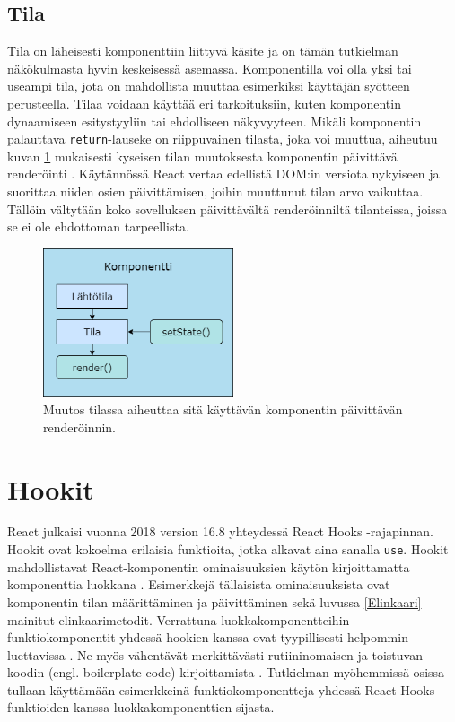 
\subsection{Tila}
\label{Tila}

Tila on läheisesti komponenttiin liittyvä käsite ja on tämän tutkielman näkökulmasta hyvin keskeisessä asemassa. Komponentilla voi olla yksi tai useampi tila, jota on mahdollista muuttaa esimerkiksi käyttäjän syötteen perusteella. Tilaa voidaan käyttää eri tarkoituksiin, kuten komponentin dynaamiseen esitystyyliin tai ehdolliseen näkyvyyteen. Mikäli komponentin palauttava \texttt{return}-lauseke on riippuvainen tilasta, joka voi muuttua, aiheutuu kuvan \ref{fig:component} mukaisesti kyseisen tilan muutoksesta komponentin päivittävä renderöinti \cite{reactandnative}. Käytännössä React vertaa edellistä DOM:in versiota nykyiseen ja suorittaa niiden osien päivittämisen, joihin muuttunut tilan arvo vaikuttaa. Tällöin vältytään koko sovelluksen päivittävältä renderöinniltä tilanteissa, joissa se ei ole ehdottoman tarpeellista. \cite{reactdocsrender}

\begin{figure}[h]
\centering \includegraphics[width=0.5\textwidth]{kuvat/Komponentti.png}
\caption{Muutos tilassa aiheuttaa sitä käyttävän komponentin päivittävän renderöinnin.}
\label{fig:component} 
\end{figure}


\section{Hookit}
\label{Hookit}

React julkaisi vuonna 2018 version 16.8 yhteydessä React Hooks -rajapinnan. Hookit ovat kokoelma erilaisia funktioita, jotka alkavat aina sanalla \texttt{use}. Hookit mahdollistavat React-komponentin ominaisuuksien käytön kirjoittamatta komponenttia luokkana \cite{reactdocshooks}. Esimerkkejä tällaisista ominaisuuksista ovat komponentin tilan määrittäminen ja päivittäminen sekä luvussa \ref{Elinkaari} mainitut elinkaarimetodit. Verrattuna luokkakomponentteihin funktiokomponentit yhdessä hookien kanssa ovat tyypillisesti helpommin luettavissa \cite[10]{buglreacthooks}. Ne myös vähentävät merkittävästi rutiininomaisen ja toistuvan koodin (engl. boilerplate code) kirjoittamista \cite{reactdocshooks} \cite[62]{reactandnative} \cite[11]{buglreacthooks}. Tutkielman myöhemmissä osissa tullaan käyttämään esimerkkeinä funktiokomponentteja yhdessä React Hooks -funktioiden kanssa luokkakomponenttien sijasta. 